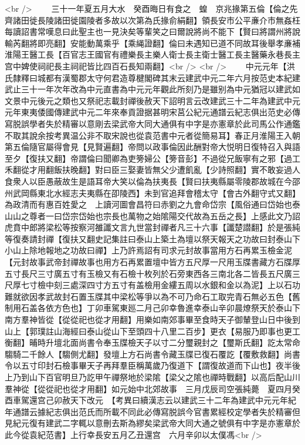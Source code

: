 <br />
　　三十一年夏五月大水　癸酉晦日有食之　蝗　京兆掾第五倫【倫之先齊諸田徙長陵諸田徙園陵者多故以次第為氏掾俞絹翻】領長安市公平亷介市無姦枉每讀詔書常嘆息曰此聖主也一見決矣等輩笑之曰爾說將尚不能下【賢曰將謂州將說輸芮翻將即亮翻】安能動萬乘乎【乘䋲證翻】倫曰未遇知已道不同故耳後舉孝亷補淮陽王醫工長【百官志王國官有禮樂長主樂人衛士長主衛士醫工長主醫藥永巷長主宫中婢使祠祀長主祠祀皆比四百石長知兩翻】<br />
<br />
　　中元元年【洪氏隸釋曰城都有漢蜀郡太守何君造尊楗閣碑其末云建武中元二年六月按范史本紀建武止三十一年次年改為中元直書為中元元年觀此所刻乃是雖别為中元猶冠以建武如文景中元後元之類也又祭祀志載封禪後赦天下詔明言云改建武三十二年為建武中元元年東夷倭國傳建武中元二年來奉貢證据甚明宋莒公紀元通譜云紀志俱出范史必傳寫脱誤學者失於精審以意剛去梁武帝大同大通俱有中字是亦憲章於此司馬公作通鑑不取其說余按考異温公非不取宋說也從袁范書中元者從簡易耳】春正月淮陽王入朝第五倫隨官屬得會見【見賢遍翻】帝問以政事倫因此酬對帝大悦明日復特召入與語至夕【復扶又翻】帝謂倫曰聞卿為吏篣婦公【篣音彭】不過從兄飯寧有之邪【過工禾翻從才用翻飯扶晚翻】對曰臣三娶妻皆無父少遭飢亂【少詩照翻】實不敢妄過人食衆人以臣愚蔽故生是語耳帝大笑以倫為扶夷長【賢曰扶夷縣屬零陵郡故城在今邵州武岡縣東北水經志夫夷縣在卲陵西】未到官追拜會稽太守【會古外翻守式又翻】為政清而有惠百姓愛之　上讀河圖會昌符曰赤劉之九會命岱宗【風俗通曰岱始也泰山山之尊者一曰岱宗岱始也宗長也萬物之始隂陽交代故為五岳之長】上感此文乃詔虎賁中郎將梁松等按察河雒讖文言九世當封禪者凡三十六事【讖楚譛翻】於是張純等復奏請封禪【復扶又翻史記集註曰泰山上築土為壇以祭天報天之功故曰封泰山下小山上除地報地之功故曰禪】上乃許焉詔有司求元封故事當用方石再累玉檢金泥【元封故事武帝封禪故事也用方石再累置壇中皆方五尺厚一尺用玉牒書藏方石牒厚五寸長尺三寸廣五寸有玉檢又有石檢十枚列於石旁東西各三南北各二皆長五尺廣三尺厚七寸檢中刻三處深四寸方五寸有盖檢用金縷五周以水銀和金以為泥】上以石功難就欲因孝武故封石置玉牒其中梁松等爭以為不可乃命石工取完青石無必五色【舊制用石盖各依方色也】丁卯車駕東廵二月己卯幸魯進幸泰山辛卯晨燎祭天於泰山下南方羣神皆從【從從祀也從才用翻】用樂如南郊事畢至食時天子御輦登山日中後到山上【郭璞註山海經曰泰山從山下至頭四十八里二百步】更衣【易服乃即事也更工衡翻】晡時升壇北面尚書令奉玉牒檢天子以寸二分璽親封之【璽斯氏翻】訖太常命騶騎二千餘人【騶側尤翻】發壇上方石尚書令藏玉牒已復石覆訖【覆敷救翻】尚書令以五寸印封石檢事畢天子再拜羣臣稱萬歲乃復道下【謂復故道而下山也】夜半後上乃到山下百官明旦乃訖甲午禪祭地於梁隂【梁父之隂也禪時戰翻】以高后配山川羣神從【從從祀也從才用翻】如元始中北郊故事　三月戊辰司空張純薨　夏四月癸酉車駕還宫己卯赦天下改元　【考異曰續漢志云以建武三十二年為建武中元元年紀年通譜云據紀志俱出范氏而所載不同此必傳寫脱誤今官書累經校定學者失於精審但見紀元復有建武二字輒以意刪去斯為繆矣梁武帝大同大通之號俱有中字是亦憲章於此今從袁紀范書】上行幸長安五月乙丑還宫　六月辛卯以太僕馮<br />
